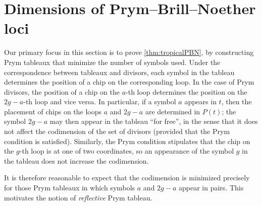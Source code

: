 \documentclass[11pt,reqno]{amsart}
\newcommand{\todo}[1]{\textcolor{red}{#1}}
\DeclareMathOperator{\codim}{codim}
\theoremstyle{definition}
\theoremstyle{problem}
\theoremstyle{plain}
\theoremstyle{remark}
\newtheorem{remark}[definition]{Remark}
\theoremstyle{theorem}
\numberwithin{equation}{section}
\numberwithin{figure}{section}
\begin{document}
%    



\section{Dimensions of Prym--Brill--Noether loci}

Our primary focus in this section is  to prove \cref{thm:tropicalPBN}, by constructing Prym tableaux  that minimize the number of symbols used.
Under the correspondence between tableaux and divisors, each symbol in the tableau determines the position of a chip on the corresponding loop. In the case of Prym divisors, the position of a chip on the $a$-th loop determines the position on the $2g-a$-th loop and vice versa. 
In particular, if a
symbol $a$ appears in $t$, then the placement of chips on the loops
$a$ and $2g-a$ are determined in $P(t)$; the symbol $2g-a$ may then
appear in the tableau ``for free'', in the sense that it does not affect the codimension of the set of divisors (provided that the Prym condition
is satisfied). Similarly, the Prym
condition stipulates that the chip on the $g$-th loop is at one of two
coordinates, so an appearance of the symbol $g$ in the tableau does
not increase the codimension. 

It is  therefore reasonable to expect that the codimension is minimized precisely for those Prym tableaux in which symbols $a$ and $2g-a$ appear in pairs. This motivates the notion of \emph{reflective} Prym tableau. 
\end{document}
